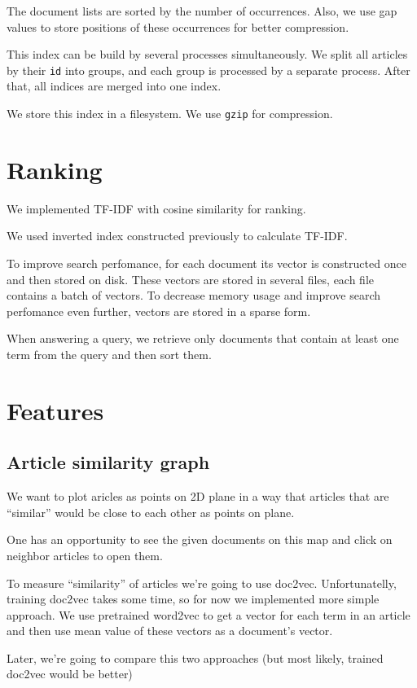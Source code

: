The document lists are sorted by the number of occurrences. Also, we use gap values to store positions of these occurrences for better compression.

This index can be build by several processes simultaneously. We split all articles by their \texttt{id} into groups, and each group is processed by a separate process. After that, all indices are merged into one index.

We store this index in a filesystem. We use \texttt{gzip} for compression.

\section{Ranking}
We implemented TF-IDF with cosine similarity for ranking.

We used inverted index constructed previously to calculate TF-IDF. 

To improve search perfomance, for each document its vector is constructed once and then stored on disk. 
These vectors are stored in several files, each file contains a batch of vectors.
To decrease memory usage and improve search perfomance even further, vectors are stored in a sparse form.

When answering a query, we retrieve only documents that contain at least one term from the query and then sort them.


\section{Features}
\subsection{Article similarity graph}
We want to plot aricles as points on 2D plane in a way that articles that are ``similar'' would be close to each other as points on plane.

One has an opportunity to see the given documents on this map and click on neighbor articles to open them. 

To measure ``similarity'' of articles we're going to use doc2vec. 
Unfortunatelly, training doc2vec takes some time, so for now we implemented more simple approach.
We use pretrained word2vec to get a vector for each term in an article and then use mean value of these vectors as a document's vector.

Later, we're going to compare this two approaches (but most likely, trained doc2vec would be better)

